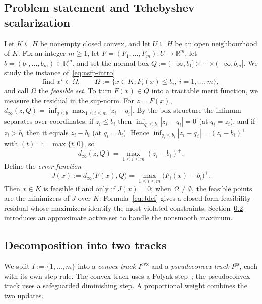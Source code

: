 \documentclass[]{interact}
\theoremstyle{plain}
\theoremstyle{definition}
\theoremstyle{remark}
\newcommand{\R}{\mathbb{R}}
\newcommand{\abs}[1]{\left\lvert #1 \right\rvert}
\newcommand{\cvx}{\mathrm{cvx}}
\newcommand{\ps}{\mathrm{ps}}
\begin{document}
\subsection{Problem statement and Tchebyshev scalarization}\label{ssec:model-stmt}
Let $K\subseteq H$ be nonempty closed convex, and let $U\subseteq H$ be an open
neighbourhood of $K$. Fix an integer $m\ge1$, let $F=(F_1,\dots,F_m):U\to\R^m$,
let $b=(b_1,\dots,b_m)\in\R^m$, and set the normal box
$Q:=(-\infty,b_1]\times\cdots\times(-\infty,b_m]$. We study the instance
of~\eqref{eq:nsfp-intro}
\begin{equation}\label{eq:nsfp-box}
\text{find } x^\star\in\Omega,\qquad
\Omega:=\bigl\{x\in K: F_i(x)\le b_i,\ i=1,\dots,m\bigr\},
\end{equation}
and call $\Omega$ the \emph{feasible set}. To turn $F(x)\in Q$ into a tractable merit
function, we measure the residual in the sup-norm. For $z=F(x)$,
$d_\infty(z,Q)=\inf_{q\le b}\max_{1\le i\le m}\abs{z_i-q_i}$. By the box structure the
infimum separates over coordinates: if $z_i\le b_i$ then
$\inf_{q_i\le b_i}\abs{z_i-q_i}=0$ (at $q_i=z_i$), and if $z_i>b_i$ then it equals
$z_i-b_i$ (at $q_i=b_i$). Hence $\inf_{q_i\le b_i}\abs{z_i-q_i}=(z_i-b_i)^+$ with
$(t)^+:=\max\{t,0\}$, so
\begin{equation}\label{eq:dinfty}
d_\infty(z,Q)=\max_{1\le i\le m}(z_i-b_i)^+ .
\end{equation}
Define the \emph{error function}
\begin{equation}\label{eq:Jdef}
J(x):=d_\infty\bigl(F(x),Q\bigr)=\max_{1\le i\le m}\bigl(F_i(x)-b_i\bigr)^+ .
\end{equation}
Then $x\in K$ is feasible if and only if $J(x)=0$; when $\Omega\ne\emptyset$, the feasible
points are the minimizers of $J$ over $K$. Formula~\eqref{eq:Jdef} gives a closed-form feasibility residual whose
maximizers identify the most violated constraints. Section~\ref{ssec:dual-track}
introduces an approximate active set to handle the nonsmooth maximum.

\subsection{Decomposition into two tracks}\label{ssec:dual-track}
We split $I:=\{1,\dots,m\}$ into a \emph{convex track} $I^{\cvx}$ and a
\emph{pseudoconvex track} $I^{\ps}$, each with its own step rule. The convex track uses a Polyak step~\citep{polyak1969};
the pseudoconvex track uses a safeguarded diminishing step.
A proportional weight combines the two updates.
\end{document}
